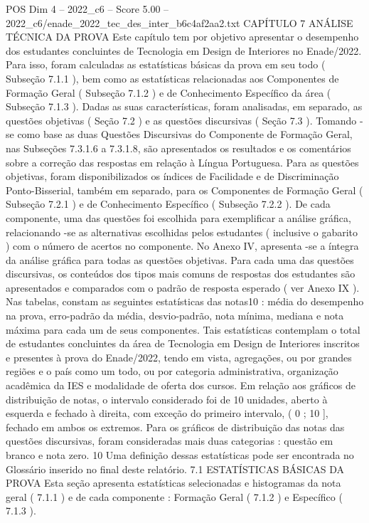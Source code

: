 \begin{textsample}{POS Dim 4 – 2022\_c6 – Score 5.00 – 2022\_c6/enade\_2022\_tec\_des\_inter\_b6c4af2aa2.txt}  \label{ex:f4_pos_081}
CAPÍTULO 7 ANÁLISE TÉCNICA DA PROVA Este capítulo tem por objetivo apresentar o desempenho dos estudantes concluintes de Tecnologia em Design de Interiores no Enade/2022.
Para isso, foram calculadas as estatísticas básicas da prova em seu todo ( Subseção 7.1.1 ), bem como as estatísticas relacionadas aos Componentes de Formação Geral ( Subseção 7.1.2 ) e de Conhecimento Específico da área ( Subseção 7.1.3 ).
Dadas as suas características, foram analisadas, em separado, as questões objetivas ( Seção 7.2 ) e as questões discursivas ( Seção 7.3 ).
Tomando -se como base as duas Questões Discursivas do Componente de Formação Geral, nas Subseções 7.3.1.6 a 7.3.1.8, são apresentados os resultados e os comentários sobre a correção das respostas em relação à Língua Portuguesa.
Para as questões objetivas, foram disponibilizados os índices de Facilidade e de Discriminação Ponto-Bisserial, também em separado, para os Componentes de Formação Geral ( Subseção 7.2.1 ) e de Conhecimento Específico ( Subseção 7.2.2 ).
De cada componente, uma das questões foi escolhida para exemplificar a análise gráfica, relacionando -se as alternativas escolhidas pelos estudantes ( inclusive o gabarito ) com o número de acertos no componente.
No Anexo IV, apresenta -se a íntegra da análise gráfica para todas as questões objetivas.
Para cada uma das questões discursivas, os conteúdos dos tipos mais comuns de respostas dos estudantes são apresentados e comparados com o padrão de resposta esperado ( ver Anexo IX ).
Nas tabelas, constam as seguintes estatísticas das notas10 : média do desempenho na prova, erro-padrão da média, desvio-padrão, nota mínima, mediana e nota máxima para cada um de seus componentes.
Tais estatísticas contemplam o total de estudantes concluintes da área de Tecnologia em Design de Interiores inscritos e presentes à prova do Enade/2022, tendo em vista, agregações, ou por grandes regiões e o país como um todo, ou por categoria administrativa, organização acadêmica da IES e modalidade de oferta dos cursos.
Em relação aos gráficos de distribuição de notas, o intervalo considerado foi de 10 unidades, aberto à esquerda e fechado à direita, com exceção do primeiro intervalo, ( 0 ; 10 ], fechado em ambos os extremos.
Para os gráficos de distribuição das notas das questões discursivas, foram consideradas mais duas categorias : questão em branco e nota zero. 10 Uma definição dessas estatísticas pode ser encontrada no Glossário inserido no final deste relatório. 7.1 ESTATÍSTICAS BÁSICAS DA PROVA Esta seção apresenta estatísticas selecionadas e histogramas da nota geral ( 7.1.1 ) e de cada componente : Formação Geral ( 7.1.2 ) e Específico ( 7.1.3 ).

\end{textsample}
